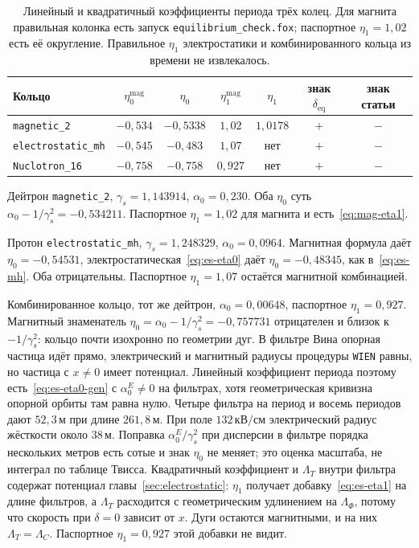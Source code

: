 \documentclass[aps,pra,preprint,a4paper,amsmath,amssymb,longbibliography]{revtex4-2}
\begin{document}
\begin{table}[t]
\centering
\caption{Линейный и квадратичный коэффициенты периода трёх колец. Для магнита правильная колонка есть запуск \texttt{equilibrium\_check.fox}; паспортное $\eta_1=1{,}02$ есть её округление. Правильное $\eta_1$ электростатики и комбинированного кольца из времени не извлекалось.}
\label{tab:map-rings}
\begin{tabular}{lcccccc}
\hline
Кольцо & $\eta_0^{\mathrm{mag}}$ & $\eta_0$ & $\eta_1^{\mathrm{mag}}$ & $\eta_1$ & знак $\delta_{\mathrm{eq}}$ & знак статьи \\
\hline
\texttt{magnetic\_2} & $-0{,}534$ & $-0{,}5338$ & $1{,}02$ & $1{,}0178$ & $+$ & $-$ \\
\texttt{electrostatic\_mh} & $-0{,}545$ & $-0{,}483$ & $1{,}07$ & нет & $+$ & $-$ \\
\texttt{Nuclotron\_16} & $-0{,}758$ & $-0{,}758$ & $0{,}927$ & нет & $+$ & $-$ \\
\hline
\end{tabular}
\end{table}

Дейтрон \texttt{magnetic\_2}, $\gamma_s=1{,}143914$, $\alpha_0=0{,}230$. Оба $\eta_0$ суть $\alpha_0-1/\gamma_s^2=-0{,}534211$. Паспортное $\eta_1=1{,}02$ для магнита и есть~\eqref{eq:mag-eta1}.

Протон \texttt{electrostatic\_mh}, $\gamma_s=1{,}248329$, $\alpha_0=0{,}0964$. Магнитная формула даёт $\eta_0=-0{,}54531$, электростатическая~\eqref{eq:es-eta0} даёт $\eta_0=-0{,}48345$, как в~\eqref{eq:es-mh}. Оба отрицательны. Паспортное $\eta_1=1{,}07$ остаётся магнитной комбинацией.

Комбинированное кольцо, тот же дейтрон, $\alpha_0=0{,}00648$, паспортное $\eta_1=0{,}927$. Магнитный знаменатель $\eta_0=\alpha_0-1/\gamma_s^2=-0{,}757731$ отрицателен и близок к $-1/\gamma_s^2$: кольцо почти изохронно по геометрии дуг. В фильтре Вина опорная частица идёт прямо, электрический и магнитный радиусы процедуры \texttt{WIEN} равны, но частица с $x\neq 0$ имеет потенциал. Линейный коэффициент периода поэтому есть~\eqref{eq:es-eta0-gen} с $\alpha_0^{E}\neq 0$ на фильтрах, хотя геометрическая кривизна опорной орбиты там равна нулю. Четыре фильтра на период и восемь периодов дают $52{,}3\,\text{м}$ при длине $261{,}8\,\text{м}$. При поле $132\,\text{кВ/см}$ электрический радиус жёсткости около $38\,\text{м}$. Поправка $\alpha_0^{E}/\gamma_s^2$ при дисперсии в фильтре порядка нескольких метров есть сотые и знак $\eta_0$ не меняет; это оценка масштаба, не интеграл по таблице Твисса. Квадратичный коэффициент и $\Lambda_T$ внутри фильтра содержат потенциал главы~\ref{sec:electrostatic}: $\eta_1$ получает добавку~\eqref{eq:es-eta1} на длине фильтров, а $\Lambda_T$ расходится с геометрическим удлинением на $\Lambda_\Phi$, потому что скорость при $\delta=0$ зависит от $x$. Дуги остаются магнитными, и на них $\Lambda_T=\Lambda_C$. Паспортное $\eta_1=0{,}927$ этой добавки не видит.
\end{document}
